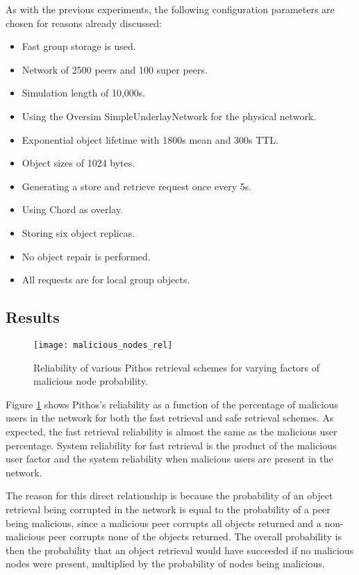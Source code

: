 As with the previous experiments, the following configuration parameters are chosen for reasons already discussed:
%
\begin{itemize}
\item Fast group storage is used.
\item Network of 2500 peers and 100 super peers.
\item Simulation length of 10,000s.
\item Using the Oversim SimpleUnderlayNetwork for the physical network.
\item Exponential object lifetime with 1800s mean and 300s TTL.
\item Object sizes of 1024 bytes.
\item Generating a store and retrieve request once every 5s.
\item Using Chord as overlay.
\item Storing six object replicas.
\item No object repair is performed.
\item All requests are for local group objects.
\end{itemize}

\subsection{Results}
\begin{figure}[htbp]
 \centering
 \texttt{[image: malicious\_nodes\_rel]}
 \caption{Reliability of various Pithos retrieval schemes for varying factors of malicious node probability.}
 \label{fig_malicious_nodes_rel}
\end{figure}
%
Figure \ref{fig_malicious_nodes_rel} shows Pithos's reliability as a function of the percentage of malicious users in the network for both the fast retrieval and safe retrieval schemes. As expected, the fast retrieval reliability is almost the same as the malicious user percentage. System reliability for fast retrieval is the product of the malicious user factor and the system reliability when malicious users are present in the network.

The reason for this direct relationship is because the probability of an object retrieval being corrupted in the network is equal to the probability of a peer being malicious, since a malicious peer corrupts all objects returned and a non-malicious peer corrupts none of the objects returned. The overall probability is then the probability that an object retrieval would have succeeded if no malicious nodes were present, multiplied by the probability of nodes being malicious.


